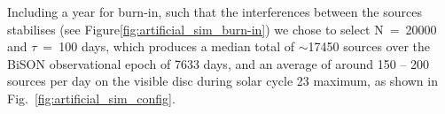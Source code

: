 Including a year for burn-in, such that the interferences between the sources stabilises (see Figure\ref{fig:artificial_sim_burn-in}) we chose to select N~=~20000 and $\tau$~=~100 days, which produces a median total of $\sim$17450 sources over the BiSON observational epoch of 7633 days, and an average of around 150 -- 200 sources per day on the visible disc during solar cycle 23 maximum, as shown in Fig.~\ref{fig:artificial_sim_config}.


\begin{figure}[!ht]
	\centering
	\qquad
	 \\
	
	\qquad
	
	\qquad
	

\end{figure}
